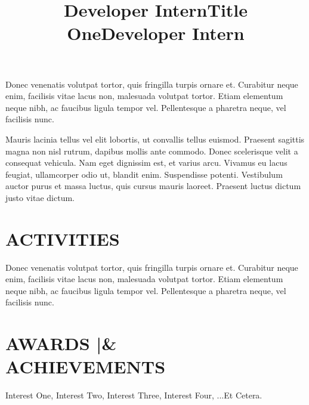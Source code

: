 \documentclass[12pt,margin]{res}
\begin{document}
\begin{resume}
\title{\textbf{Developer Intern}}
\begin{position}
Donec venenatis volutpat tortor, quis fringilla turpis ornare et. Curabitur 
neque enim, facilisis vitae lacus non, malesuada volutpat tortor. Etiam 
elementum neque nibh, ac faucibus ligula tempor vel. Pellentesque a pharetra 
neque, vel facilisis nunc.
\end{position}

\title{\textbf{Title One}}
\begin{position}
Mauris lacinia tellus vel elit lobortis, ut convallis tellus euismod. Praesent 
sagittis magna non nisl rutrum, dapibus mollis ante commodo. Donec scelerisque 
velit a consequat vehicula. Nam eget dignissim est, et varius arcu. Vivamus eu 
lacus feugiat, ullamcorper odio ut, blandit enim. Suspendisse potenti. 
Vestibulum auctor purus et massa luctus, quis cursus mauris laoreet. Praesent 
luctus dictum justo vitae dictum.
\end{position}
\section{ACTIVITIES}
\title{\textbf{Developer Intern}}
\begin{position}
Donec venenatis volutpat tortor, quis fringilla turpis ornare et. Curabitur 
neque enim, facilisis vitae lacus non, malesuada volutpat tortor. Etiam 
elementum neque nibh, ac faucibus ligula tempor vel. Pellentesque a pharetra 
neque, vel facilisis nunc.
\end{position}
\section{AWARDS |\& \\ ACHIEVEMENTS}
Interest One, Interest Two, Interest Three, Interest Four, ...Et Cetera.
\end{resume}
\end{document}
